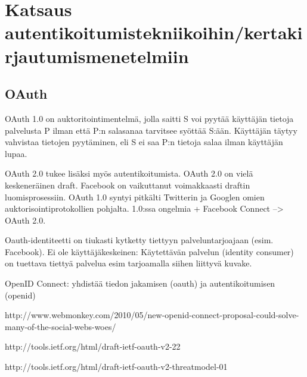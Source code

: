 \documentclass[english,gradu]{tktltiki}
\begin{document}

\section{Katsaus autentikoitumistekniikoihin/kertakirjautumismenetelmiin} %
\label{sec:katsaus_autentikoitumistekniikoihin_kertakirjautumismenetelmiin}


\subsection{OAuth} %
\label{sub:oaauth_auktorisointimenetelmä}

OAuth 1.0 on auktoritointimentelmä, jolla saitti S voi pyytää käyttäjän tietoja palvelusta P ilman että P:n salasanaa tarvitsee syöttää S:ään. Käyttäjän täytyy vahvistaa tietojen pyytäminen, eli S ei saa P:n tietoja salaa ilman käyttäjän lupaa.

OAuth 2.0 tukee lisäksi myös autentikoitumista. OAuth 2.0 on vielä keskeneräinen draft. Facebook on vaikuttanut voimakkaasti draftin luomisprosessiin. OAuth 1.0 syntyi pitkälti Twitterin ja Googlen omien auktorisointiprotokollien pohjalta. 1.0:ssa ongelmia + Facebook Connect --> OAuth 2.0.


Oauth-identiteetti on tiukasti kytketty tiettyyn palveluntarjoajaan (esim. Facebook).
Ei ole käyttäjäkeskeinen: Käytettävän palvelun (identity consumer) on tuettava tiettyä palvelua esim tarjoamalla siihen liittyvä kuvake.

OpenID Connect: yhdistää tiedon jakamisen (oauth) ja autentikoitumisen (openid)

http://www.webmonkey.com/2010/05/new-openid-connect-proposal-could-solve-many-of-the-social-webs-woes/


http://tools.ietf.org/html/draft-ietf-oauth-v2-22

http://tools.ietf.org/html/draft-ietf-oauth-v2-threatmodel-01
\end{document}
